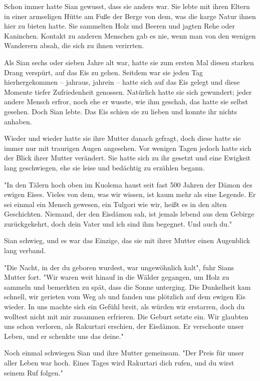 \documentclass[10pt, a4paper, oneside]{book}
\begin{document}
\begin{multicols}{2}
Schon immer hatte Sian gewusst, dass sie anders war. Sie lebte mit ihren Eltern in einer armseligen Hütte am Fuße der Berge von dem, was die karge Natur ihnen hier zu bieten hatte. Sie sammelten Holz und Beeren und jagten Rehe oder Kaninchen. Kontakt zu anderen Menschen gab es nie, wenn man von den wenigen Wanderern absah, die sich zu ihnen verirrten.

Als Sian sechs oder sieben Jahre alt war, hatte sie zum ersten Mal diesen starken Drang verspürt, auf das Eis zu gehen. Seitdem war sie jeden Tag hierhergekommen – jahraus, jahrein – hatte sich auf das Eis gelegt und diese Momente tiefer Zufriedenheit genossen. Natürlich hatte sie sich gewundert; jeder andere Mensch erfror, noch ehe er wusste, wie ihm geschah, das hatte sie selbst gesehen. Doch Sian lebte. Das Eis schien sie zu lieben und konnte ihr nichts anhaben.

Wieder und wieder hatte sie ihre Mutter danach gefragt, doch diese hatte sie immer nur mit traurigen Augen angesehen. Vor wenigen Tagen jedoch hatte sich der Blick ihrer Mutter verändert. Sie hatte sich zu ihr gesetzt und eine Ewigkeit lang geschwiegen, ehe sie leise und bedächtig zu erzählen begann.

"In den Tälern hoch oben im Kuolema haust seit fast 500 Jahren der Dämon des ewigen Eises. Vieles von dem, was wir wissen, ist kaum mehr als eine Legende. Er sei einmal ein Mensch gewesen, ein Tulgori wie wir, heißt es in den alten Geschichten. Niemand, der den Eisdämon sah, ist jemals lebend aus dem Gebirge zurückgekehrt, doch dein Vater und ich sind ihm begegnet. Und auch du."\bigskip

Sian schwieg, und es war das Einzige, das sie mit ihrer Mutter einen Augenblick lang verband.

"Die Nacht, in der du geboren wurdest, war ungewöhnlich kalt", fuhr Sians Mutter fort. "Wir waren weit hinauf in die Wälder gegangen, um Holz zu sammeln und bemerkten zu spät, dass die Sonne unterging. Die Dunkelheit kam schnell, wir gerieten vom Weg ab und fanden uns plötzlich auf dem ewigen Eis wieder. In uns machte sich ein Gefühl breit, als würden wir erstarren, doch du wolltest nicht mit mir zusammen erfrieren. Die Geburt setzte ein. Wir glaubten uns schon verloren, als Rakurtari erschien, der Eisdämon. Er verschonte unser Leben, und er schenkte uns das deine."\bigskip

Noch einmal schwiegen Sian und ihre Mutter gemeinsam. "Der Preis für unser aller Leben war hoch. Eines Tages wird Rakurtari dich rufen, und du wirst seinem Ruf folgen."


\end{multicols}
\end{document}
